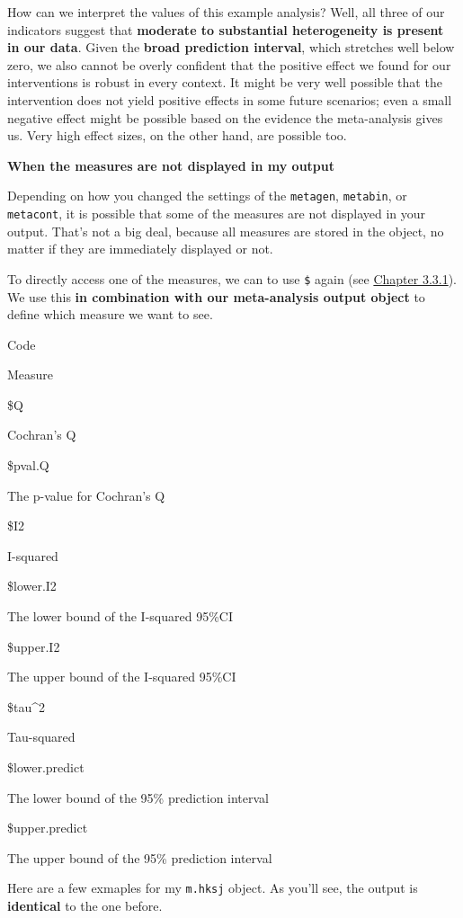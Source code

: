 \documentclass[]{book}
\begin{document}
How can we interpret the values of this example analysis? Well, all three of our indicators suggest that \textbf{moderate to substantial heterogeneity is present in our data}. Given the \textbf{broad prediction interval}, which stretches well below zero, we also cannot be overly confident that the positive effect we found for our interventions is robust in every context. It might be very well possible that the intervention does not yield positive effects in some future scenarios; even a small negative effect might be possible based on the evidence the meta-analysis gives us. Very high effect sizes, on the other hand, are possible too.

\textbf{When the measures are not displayed in my output}

Depending on how you changed the settings of the \texttt{metagen}, \texttt{metabin}, or \texttt{metacont}, it is possible that some of the measures are not displayed in your output. That's not a big deal, because all measures are stored in the object, no matter if they are immediately displayed or not.

To directly access one of the measures, we can to use \texttt{\$} again (see \protect\hyperlink{convertfactors}{Chapter 3.3.1}). We use this \textbf{in combination with our meta-analysis output object} to define which measure we want to see.

Code

Measure

\$Q

Cochran's Q

\$pval.Q

The p-value for Cochran's Q

\$I2

I-squared

\$lower.I2

The lower bound of the I-squared 95\%CI

\$upper.I2

The upper bound of the I-squared 95\%CI

\$tau\^{}2

Tau-squared

\$lower.predict

The lower bound of the 95\% prediction interval

\$upper.predict

The upper bound of the 95\% prediction interval

Here are a few exmaples for my \texttt{m.hksj} object. As you'll see, the output is \textbf{identical} to the one before.
\end{document}
